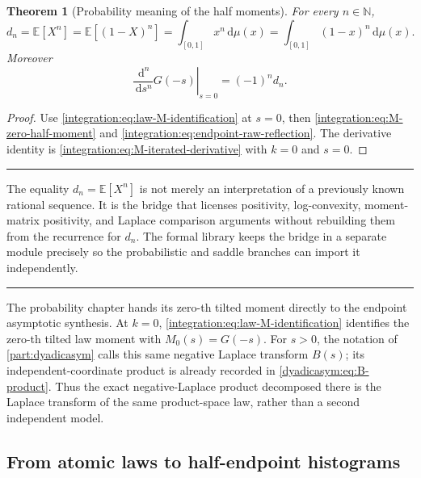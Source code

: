 \documentclass[11pt,oneside]{article}
\newtheorem{theorem}{Theorem}[section]
\theoremstyle{definition}
\theoremstyle{remark}
\newcommand{\N}{\mathbb N}
\newcommand{\dd}{\,\mathrm d}
\newcommand{\E}{\mathbb E}
\newenvironment{boxedremark}{%
  \par\smallskip\noindent\begin{center}\begin{minipage}{0.94\textwidth}%
  \color{black}\hrule\vspace{0.6em}\small
}{%
  \vspace{0.6em}\hrule\end{minipage}\end{center}\smallskip
}
\begin{document}
\begin{theorem}[Probability meaning of the half moments]
\label{integration:thm:half-moments-probability}
For every $n\in\N$,
\begin{equation}
 d_n=\E[X^n]=\E[(1-X)^n]
     =\int_{[0,1]}x^n\dd\mu(x)
     =\int_{[0,1]}(1-x)^n\dd\mu(x).
 \label{integration:eq:half-moment-probability}
\end{equation}
Moreover
\begin{equation}
 \left.\frac{\dd^n}{\dd s^n}G(-s)\right|_{s=0}=(-1)^nd_n.
 \label{integration:eq:generating-jet-half-moments}
\end{equation}
\end{theorem}

\begin{proof}
Use \eqref{integration:eq:law-M-identification} at $s=0$, then
\eqref{integration:eq:M-zero-half-moment} and \eqref{integration:eq:endpoint-raw-reflection}.  The derivative identity
is \eqref{integration:eq:M-iterated-derivative} with $k=0$ and $s=0$.
\end{proof}

\begin{boxedremark}
The equality $d_n=\E[X^n]$ is not merely an interpretation of a previously known rational
sequence.  It is the bridge that licenses positivity, log-convexity, moment-matrix
positivity, and Laplace comparison arguments without rebuilding them from the recurrence for
$d_n$.  The formal library keeps the bridge in a separate module precisely so the
probabilistic and saddle branches can import it independently.
\end{boxedremark}

The probability chapter hands its zero-th tilted moment directly to the endpoint
asymptotic synthesis.  At \(k=0\),
\eqref{integration:eq:law-M-identification} identifies the zero-th tilted law moment with
\(M_0(s)=G(-s)\).  For \(s>0\), the notation of \cref{part:dyadicasym} calls this same
negative Laplace transform \(B(s)\); its independent-coordinate product is already recorded
in \eqref{dyadicasym:eq:B-product}.  Thus the exact negative-Laplace product decomposed there
is the Laplace transform of the same product-space law, rather than a second independent
model.

\subsection{From atomic laws to half-endpoint histograms}
\label{integration:sec:step-measure-bridge}
\end{document}
